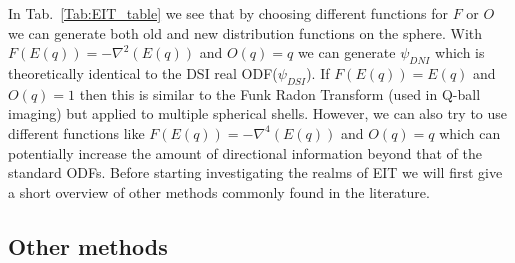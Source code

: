 \documentclass{bioinfo}
\begin{document}
\begin{methods}
\begin{flushleft}
\par\end{flushleft}

%
In Tab.~\ref{Tab:EIT_table} we see that by choosing different functions
for $F$ or $O$ we can generate both old and new distribution functions
on the sphere. With $F(E(q))=-\nabla^{2}(E(q))$ and $O(q)=q$ we
can generate $\psi_{DNI}$ which is theoretically identical to the
DSI real ODF($\psi_{DSI}$). If $F(E(q))=E(q)$ and $O(q)=1$ then
this is similar to the Funk Radon Transform (used in Q-ball imaging)
but applied to multiple spherical shells. However, we can also try
to use different functions like $F(E(q))=-\nabla^{4}(E(q))$ and $O(q)=q$
which can potentially increase the amount of directional information
beyond that of the standard ODFs. Before starting investigating the
realms of EIT we will first give a short overview of other methods
commonly found in the literature.


\subsection{Other methods}


\end{methods}
\end{document}
